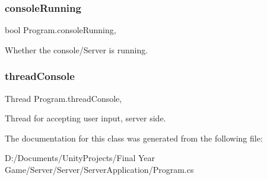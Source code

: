 \subsubsection{\texorpdfstring{consoleRunning}{consoleRunning}}
{\footnotesize\ttfamily bool Program.\+console\+Running\hspace{0.3cm}{\ttfamily [static]}, {\ttfamily [private]}}



Whether the console/\+Server is running. 

\mbox{\label{class_program_ae9e0fdfd8f03f67dd94c12d12c27381c}} 
\subsubsection{\texorpdfstring{threadConsole}{threadConsole}}
{\footnotesize\ttfamily Thread Program.\+thread\+Console\hspace{0.3cm}{\ttfamily [static]}, {\ttfamily [private]}}



Thread for accepting user input, server side. 



The documentation for this class was generated from the following file\+:\begin{DoxyCompactItemize}
\item 
D\+:/\+Documents/\+Unity\+Projects/\+Final Year Game/\+Server/\+Server/\+Server\+Application/Program.\+cs\end{DoxyCompactItemize}
